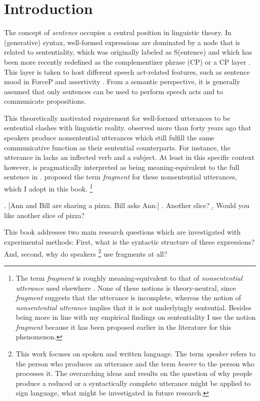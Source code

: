 \chapter{Introduction} \label{sec:intro}
\largerpage
The concept of \textit{sentence} occupies a central position in linguistic theory. In (generative) syntax, well-formed expressions are dominated by a node that is related to sententiality, which was originally labeled as S(entence) \citep[see e.g.][]{chomsky1965} and which has been more recently redefined as the complementizer phrase (CP) or a CP layer \citep{rizzi1997}. This layer is taken to host different speech act-related features, such as sentence mood in  ForceP and assertivity \citep{krifka1995}. From a semantic perspective, it is generally assumed that only sentences can be used to perform speech acts and to communicate propositions.

This theoretically motivated requirement for well-formed utterances to be sentential clashes with linguistic reality. \citet{morgan1973} observed more than forty years ago that speakers produce nonsentential utterances which still fulfill the same communicative function as their sentential counterparts. For instance, the utterance in \Next[a] lacks an inflected verb and a subject. At least in this specific context however, \Next[a] is pragmatically interpreted as being meaning-equivalent to the full sentence in \Next[b]. \citet{morgan1973} proposed the term \textit{fragment} for these nonsentential utterances, which I adopt in this book.%
%
\footnote{The term \textit{fragment} is roughly meaning-equivalent to that of \textit{nonsentential utterance} used elsewhere \citep{fernandez.ginzburg2002, barton.progovac2005, stainton2006}. None of these notions is theory-neutral, since \textit{fragment} suggests that the utterance is incomplete, whereas the notion of \textit{nonsentential utterance} implies that it is not underlyingly sentential. Besides being more in line with my empirical findings on sententiality I use the notion \textit{fragment} because it has been proposed earlier in the literature for this phenomenon.}\afterfn%
%

\ex. [Ann and Bill are sharing a pizza. Bill asks Ann:] 
    \a. Another slice? \label{ex:intro-fragment}
     \b. Would you like another slice of pizza?
 
This book addresses two main research questions which are investigated with experimental methods: First, what is the syntactic structure of these expressions? And, second, why do speakers%
%
\footnote{This work focuses on spoken and written language. The term \textit{speaker} refers to the person who produces an utterance and the term \textit{hearer} to the person who processes it. The overarching ideas and results on the question of why people produce a reduced or a syntactically complete utterance might be applied to sign language, what might be investigated in future research.}\afterfn%
%
use fragments at all?

